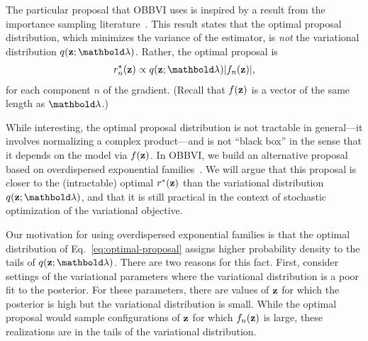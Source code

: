 \documentclass[]{article}
\begin{document}
 The particular proposal that
\gls{OBBVI} uses is inspired by a result from the importance sampling
literature~\citep{Robert2005,Owen2013}. This result
states that the optimal proposal distribution, which minimizes the
variance of the estimator, is \emph{not} the variational distribution
$q(\bz;\blambda)$. Rather, the optimal proposal is
\begin{align}
  \label{eq:optimal-proposal}
  r_n^{\star}(\bz)\propto q(\bz;\blambda) |f_n(\bz)|,
\end{align}
for each component $n$ of the gradient. (Recall that $f(\mathbf{z})$ is a
vector of the same length as $\blambda$.)

%


While interesting, the optimal proposal distribution is not tractable
in general---it involves normalizing a complex product---and is not
``black box'' in the sense that it depends on the model
via $f(\mathbf{z})$. In \gls{OBBVI}, we build an
alternative proposal based on overdispersed exponential
families~\citep{Jorgensen1987}.  We will argue that this proposal is
closer to the (intractable) optimal $r^*(\mathbf{z})$ than the variational
distribution $q(\bz;\blambda)$, and that it is still practical in the
context of stochastic optimization of the variational objective.

 Our motivation for using
overdispersed exponential families is that the optimal distribution of
Eq.~\ref{eq:optimal-proposal} assigns higher probability density to
the tails of $q(\bz;\blambda)$. There are two reasons for this
fact. First, consider settings of the variational parameters where the
variational distribution is a poor fit to the posterior.  For these
parameters, there are values of $\mathbf{z}$ for which the posterior is high
but the variational distribution is small. While the optimal proposal
would sample configurations of $\mathbf{z}$ for which $f_n(\mathbf{z})$ is large,
these realizations are in the tails of the variational distribution.
\end{document}
